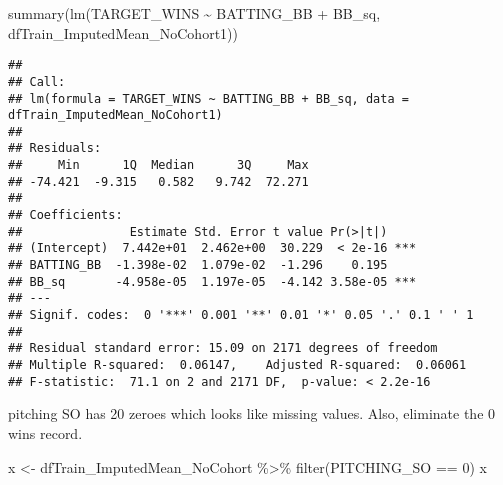 \documentclass[
]{article}
\newenvironment{Shaded}{\begin{snugshade}}{\end{snugshade}}
\newcommand{\DecValTok}[1]{\textcolor[rgb]{0.00,0.00,0.81}{#1}}
\newcommand{\FunctionTok}[1]{\textcolor[rgb]{0.00,0.00,0.00}{#1}}
\newcommand{\NormalTok}[1]{#1}
\newcommand{\OtherTok}[1]{\textcolor[rgb]{0.56,0.35,0.01}{#1}}
\newcommand{\SpecialCharTok}[1]{\textcolor[rgb]{0.00,0.00,0.00}{#1}}
\begin{document}
\begin{Shaded}
\begin{Highlighting}[]
\FunctionTok{summary}\NormalTok{(}\FunctionTok{lm}\NormalTok{(TARGET\_WINS }\SpecialCharTok{\textasciitilde{}}\NormalTok{ BATTING\_BB }\SpecialCharTok{+}\NormalTok{ BB\_sq, dfTrain\_ImputedMean\_NoCohort1))}
\end{Highlighting}
\end{Shaded}

\begin{verbatim}
## 
## Call:
## lm(formula = TARGET_WINS ~ BATTING_BB + BB_sq, data = dfTrain_ImputedMean_NoCohort1)
## 
## Residuals:
##     Min      1Q  Median      3Q     Max 
## -74.421  -9.315   0.582   9.742  72.271 
## 
## Coefficients:
##               Estimate Std. Error t value Pr(>|t|)    
## (Intercept)  7.442e+01  2.462e+00  30.229  < 2e-16 ***
## BATTING_BB  -1.398e-02  1.079e-02  -1.296    0.195    
## BB_sq       -4.958e-05  1.197e-05  -4.142 3.58e-05 ***
## ---
## Signif. codes:  0 '***' 0.001 '**' 0.01 '*' 0.05 '.' 0.1 ' ' 1
## 
## Residual standard error: 15.09 on 2171 degrees of freedom
## Multiple R-squared:  0.06147,    Adjusted R-squared:  0.06061 
## F-statistic:  71.1 on 2 and 2171 DF,  p-value: < 2.2e-16
\end{verbatim}

pitching SO has 20 zeroes which looks like missing values. Also,
eliminate the 0 wins record.

\begin{Shaded}
\begin{Highlighting}[]
\NormalTok{x }\OtherTok{\textless{}{-}}\NormalTok{ dfTrain\_ImputedMean\_NoCohort }\SpecialCharTok{\%\textgreater{}\%} 
  \FunctionTok{filter}\NormalTok{(PITCHING\_SO }\SpecialCharTok{==} \DecValTok{0}\NormalTok{)}
\NormalTok{x}
\end{Highlighting}
\end{Shaded}
\end{document}
